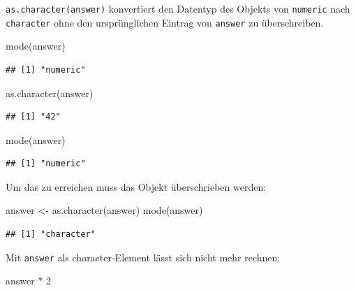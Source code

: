 \documentclass[
]{book}
\newenvironment{Shaded}{\begin{snugshade}}{\end{snugshade}}
\newcommand{\DecValTok}[1]{\textcolor[rgb]{0.00,0.00,0.81}{#1}}
\newcommand{\FunctionTok}[1]{\textcolor[rgb]{0.00,0.00,0.00}{#1}}
\newcommand{\NormalTok}[1]{#1}
\newcommand{\OtherTok}[1]{\textcolor[rgb]{0.56,0.35,0.01}{#1}}
\newcommand{\SpecialCharTok}[1]{\textcolor[rgb]{0.00,0.00,0.00}{#1}}
\begin{document}
\texttt{as.character(answer)} konvertiert den Datentyp des Objekts von \texttt{numeric} nach \texttt{character} ohne den ursprünglichen Eintrag von \texttt{answer} zu überschreiben.

\begin{Shaded}
\begin{Highlighting}[]
\FunctionTok{mode}\NormalTok{(answer)}
\end{Highlighting}
\end{Shaded}

\begin{verbatim}
## [1] "numeric"
\end{verbatim}

\begin{Shaded}
\begin{Highlighting}[]
\FunctionTok{as.character}\NormalTok{(answer)}
\end{Highlighting}
\end{Shaded}

\begin{verbatim}
## [1] "42"
\end{verbatim}

\begin{Shaded}
\begin{Highlighting}[]
\FunctionTok{mode}\NormalTok{(answer)}
\end{Highlighting}
\end{Shaded}

\begin{verbatim}
## [1] "numeric"
\end{verbatim}

Um das zu erreichen muss das Objekt überschrieben werden:

\begin{Shaded}
\begin{Highlighting}[]
\NormalTok{answer }\OtherTok{\textless{}{-}} \FunctionTok{as.character}\NormalTok{(answer)}
\FunctionTok{mode}\NormalTok{(answer)}
\end{Highlighting}
\end{Shaded}

\begin{verbatim}
## [1] "character"
\end{verbatim}

Mit \texttt{answer} als character-Element lässt sich nicht mehr rechnen:

\begin{Shaded}
\begin{Highlighting}[]
\NormalTok{answer }\SpecialCharTok{*} \DecValTok{2}
\end{Highlighting}
\end{Shaded}
\end{document}
